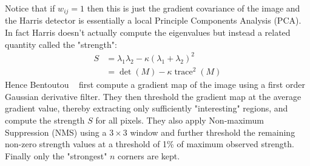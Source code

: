 Notice that if $w_{ij} = 1$ then this is just the gradient covariance of the image and the Harris detector is essentially a local Principle Components Analysis (PCA).
%
In fact Harris doesn't actually compute the eigenvalues but instead a related quantity called the "strength":
\begin{align}
    S &= \lambda_1 \lambda_2 - \kappa (\lambda_1 + \lambda_2)^2 \\
    &= \operatorname{det}(M) - \kappa \operatorname{trace}^2(M)
    \label{eqn:strength}
\end{align}
%
Hence Bentoutou \etal~ first compute a gradient map of the image using a first order Gaussian derivative filter.
%
They then threshold the gradient map at the average gradient value, thereby extracting only sufficiently "interesting" regions, and compute the strength $S$ for all pixels.
%
They also apply Non-maximum Suppression (NMS) using a $3 \times 3$ window and further threshold the remaining non-zero strength values at a threshold of 1\% of maximum observed strength.
%
Finally only the "strongest" $n$ corners are kept.

